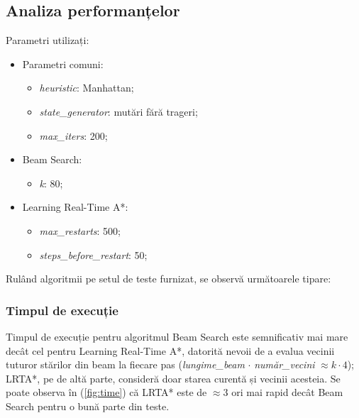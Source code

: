 \documentclass{article}
\begin{document}
\subsection{Analiza performanțelor}

Parametri utilizați:
\begin{itemize}
    \item Parametri comuni:
    \begin{itemize}
        \item \textit{heuristic}: Manhattan;
        \item \textit{state\_generator}: mutări fără trageri;
        \item \textit{max\_iters}: 200;
    \end{itemize}
    \item Beam Search:
    \begin{itemize}
        \item \textit{k}: 80;
    \end{itemize}
    \item Learning Real-Time A*:
    \begin{itemize}
        \item \textit{max\_restarts}: 500;
        \item \textit{steps\_before\_restart}: 50;
    \end{itemize}
\end{itemize}

Rulând algoritmii pe setul de teste furnizat, se observă următoarele tipare:

\subsubsection*{Timpul de execuție}
Timpul de execuție pentru algoritmul Beam Search este semnificativ mai mare
decât cel pentru Learning Real-Time A*, datorită nevoii de a evalua vecinii 
tuturor stărilor din beam la fiecare pas (\textit{lungime\_beam} $\cdot$ 
\textit{număr\_vecini} $\approx k \cdot 4$); LRTA*, pe de altă parte, consideră
doar starea curentă și vecinii acesteia. Se poate observa în (\ref{fig:time}) că
LRTA* este de $\approx 3$ ori mai rapid decât Beam Search pentru o bună parte 
din teste. 
\end{document}
